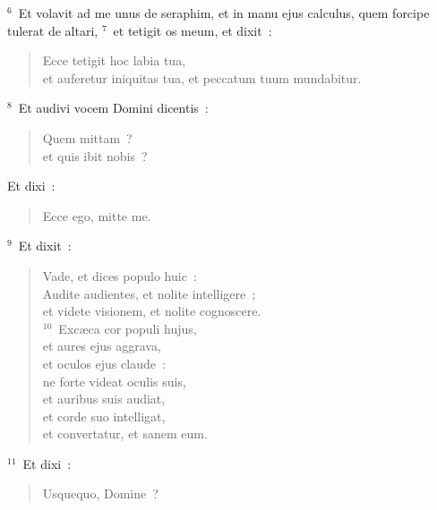 ${}^{6}$~Et volavit ad me unus de seraphim, et in manu ejus calculus, quem forcipe tulerat de altari,
${}^{7}$~et tetigit os meum, et dixit~: \begin{flushleft}\begin{verse}Ecce tetigit hoc labia tua,\\ et auferetur iniquitas tua, et peccatum tuum mundabitur.\end{verse}\end{flushleft}


${}^{8}$~Et audivi vocem Domini dicentis~: \begin{flushleft}\begin{verse}Quem mittam~?\\ et quis ibit nobis~?\end{verse}\end{flushleft}

 Et dixi~: \begin{flushleft}\begin{verse}Ecce ego, mitte me.\end{verse}\end{flushleft}


${}^{9}$~Et dixit~: \begin{flushleft}\begin{verse}Vade, et dices populo huic~:\\ Audite audientes, et nolite intelligere~;\\ et videte visionem, et nolite cognoscere.\\
${}^{10}$~Exc\ae ca cor populi hujus,\\ et aures ejus aggrava,\\ et oculos ejus claude~:\\ ne forte videat oculis suis,\\ et auribus suis audiat,\\ et corde suo intelligat,\\ et convertatur, et sanem eum.\end{verse}\end{flushleft}


${}^{11}$~Et dixi~: \begin{flushleft}\begin{verse}Usquequo, Domine~?\end{verse}\end{flushleft}

